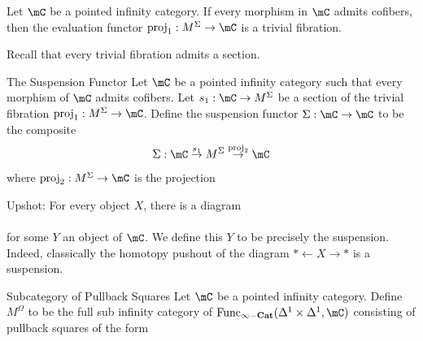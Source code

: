 \documentclass[a4paper]{article}
\begin{document}
\begin{lmm}{}{} Let $\mC$ be a pointed infinity category. If every morphism in $\mC$ admits cofibers, then the evaluation functor $\text{proj}_1:M^\Sigma\to\mC$ is a trivial fibration. 
\end{lmm}

Recall that every trivial fibration admits a section. 

\begin{defn}{The Suspension Functor}{} Let $\mC$ be a pointed infinity category such that every morphism of $\mC$ admits cofibers. Let $s_1:\mC\to M^\Sigma$ be a section of the trivial fibration $\text{proj}_1:M^\Sigma\to\mC$. Define the suspension functor $\Sigma:\mC\to\mC$ to be the composite $$\Sigma:\mC\overset{s_1}{\rightarrow}M^\Sigma\overset{\text{proj}_2}{\rightarrow}\mC$$ where $\text{proj}_2:M^\Sigma\to\mC$ is the projection 
\end{defn}

Upshot: For every object $X$, there is a diagram \\
\\
for some $Y$ an object of $\mC$. We define this $Y$ to be precisely the suspension. Indeed, classically the homotopy pushout of the diagram $\ast\leftarrow X\rightarrow\ast$ is a suspension. 

\begin{defn}{Subcategory of Pullback Squares}{} Let $\mC$ be a pointed infinity category. Define $M^\Omega$ to be the full sub infinity category of $\text{Func}_\bold{\infty-\bold{Cat}}(\Delta^1\times\Delta^1,\mC)$ consisting of pullback squares of the form \\
\\
\end{defn}
\end{document}
